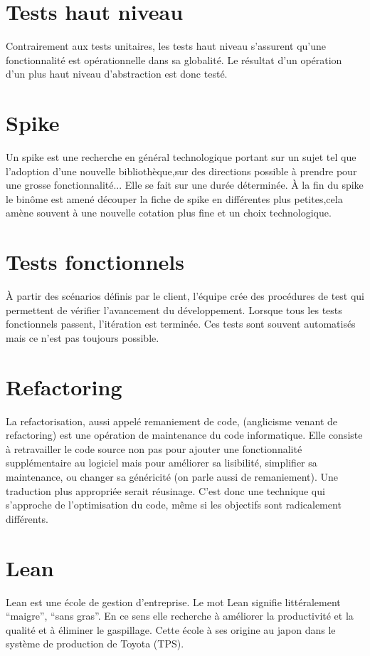 \section{Tests haut niveau}\label{lexique:testHL}
Contrairement aux tests unitaires, les tests haut niveau s'assurent qu'une fonctionnalité est opérationnelle dans sa globalité. Le résultat d'un opération d'un plus haut niveau d'abstraction est donc testé.
\section{Spike}\label{lexique:spike}
Un spike est une recherche en général technologique portant sur un sujet tel que l'adoption d'une nouvelle bibliothèque,sur des directions possible à prendre pour une grosse fonctionnalité... Elle se fait sur une durée déterminée. À la fin du spike le binôme est amené découper la fiche de spike en différentes plus petites,cela amène souvent à une nouvelle cotation plus fine et un choix technologique.
\section{Tests fonctionnels}\label{lexique:testsFonctionnels}
À partir des scénarios définis par le client, l'équipe crée des procédures de test qui permettent de vérifier l'avancement du développement. Lorsque tous les tests fonctionnels passent, l'itération est terminée. Ces tests sont souvent automatisés mais ce n'est pas toujours possible.
\section{Refactoring}\label{lexique:refactoring}
La refactorisation, aussi appelé remaniement de code, (anglicisme venant de refactoring) est une opération de maintenance du code informatique. Elle consiste à retravailler le code source non pas pour ajouter une fonctionnalité supplémentaire au logiciel mais pour améliorer sa lisibilité, simplifier sa maintenance, ou changer sa généricité (on parle aussi de remaniement). Une traduction plus appropriée serait réusinage. C'est donc une technique qui s'approche de l'optimisation du code, même si les objectifs sont radicalement différents. 
\section{Lean}\label{lexique:lean}
Lean est une école de gestion d'entreprise. Le mot Lean signifie littéralement ``maigre'', ``sans gras''. En ce sens elle recherche à améliorer la productivité et la qualité et à éliminer le gaspillage. Cette école à ses origine au japon dans le système de production de Toyota (TPS).
